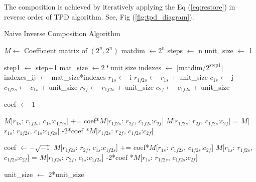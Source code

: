 \documentclass[twocolumn]{article}
\begin{document}
The composition is achieved by iteratively applying the Eq (\ref{eq:restore}) in reverse order of TPD algorithm. 
See, Fig (\ref{fig:tpd_diagram}).

\begin{algorithm}
    \caption{Naive Inverse Composition Algorithm}\label{alg:naive_inverse}
    \begin{algorithmic}
        \Require $M \gets$ Coefficient matrix of $(2^n, 2^n)$
        \State matdim $\gets 2^n$
        \State steps $\gets$ n
        \State unit\_size $\gets$ 1

            \State step1 $\gets$ step+1
            \State mat\_size $\gets 2*\text{unit\_size}$
            \State indexes $\gets$ [matdim/$2^{\text{step1}}$]
            \State indexes\_ij $\gets$ mat\_size*indexes
                \State $r_{1s}\gets$ i
                \State $r_{1f2s}\gets$ $r_{1s}$ + unit\_size
                \State $c_{1s}\gets$ j
                \State $c_{1f2s}\gets$ $c_{1s}$ + unit\_size
                \State $r_{2f}\gets$ $r_{1f2s}$ + unit\_size
                \State $c_{2f}\gets$ $c_{1f2s}$ + unit\_size

                \State coef $\gets$ 1

                \State $M$[$r_{1s}$: $r_{1f2s}$, $c_{1s}$:$c_{1f2s}$] += coef*$M$[$r_{1f2s}$: $r_{2f}$, $c_{1f2s}$:$c_{2f}$]
                \State $M$[$r_{1f2s}$: $r_{2f}$, $c_{1f2s}$:$c_{2f}$] = $M$[$r_{1s}$: $r_{1f2s}$, $c_{1s}$:$c_{1f2s}$] -2*coef *$M$[$r_{1f2s}$: $r_{2f}$, $c_{1f2s}$:$c_{2f}$]

                \State coef $\gets - \sqrt{-1}$ 
                \State $M$[$r_{1f2s}$: $r_{2f}$, $c_{1s}$:$c_{1f2s}$] += coef*$M$[$r_{1s}$: $r_{1f2s}$, $c_{1f2s}$:$c_{2f}$]
                \State $M$[$r_{1s}$: $r_{1f2s}$, $c_{1f2s}$:$c_{2f}$] = $M$[$r_{1f2s}$: $r_{2f}$, $c_{1s}$:$c_{1f2s}$] -2*coef *$M$[$r_{1s}$: $r_{1f2s}$, $c_{1f2s}$:$c_{2f}$]
                
                \EndFor
            \EndFor
            \State unit\_size $\gets$ 2*unit\_size
        \EndFor
    \end{algorithmic}
\end{algorithm}
\end{document}
